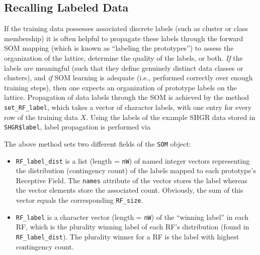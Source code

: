 \documentclass[]{article}
\newenvironment{Shaded}{\begin{snugshade}}{\end{snugshade}}
\newcommand{\KeywordTok}[1]{\textcolor[rgb]{0.13,0.29,0.53}{\textbf{#1}}}
\newcommand{\NormalTok}[1]{#1}
\newcommand{\OperatorTok}[1]{\textcolor[rgb]{0.81,0.36,0.00}{\textbf{#1}}}
\providecommand{\tightlist}{%
  \setlength{\itemsep}{0pt}\setlength{\parskip}{0pt}}
\begin{document}
\hypertarget{recalling-labeled-data}{%
\subsection{Recalling Labeled Data}\label{recalling-labeled-data}}

If the training data possesses associated discrete labels (such as cluster or class membership) it is often helpful to propagate these labels through the forward SOM mapping (which is known as ``labeling the prototypes'') to assess the organization of the lattice, determine the quality of the labels, or both. \emph{If} the labels are meaningful (such that they define genuinely distinct data classes or clusters), and \emph{if} SOM learning is adequate (i.e., performed correctly over enough training steps), then one expects an organization of prototype labels on the lattice. Propagation of data labels through the SOM is achieved by the method \texttt{set\_RF\_label}, which takes a vector of character labels, with one entry for every row of the training data \(X\). Using the labels of the example SHGR data stored in \texttt{SHGR\$label}, label propagation is performed via

\begin{Shaded}
\end{Shaded}

The above method sets two different fields of the \texttt{SOM} object:

\begin{itemize}
\tightlist
\item
  \texttt{RF\_label\_dist} is a list (length = \texttt{nW}) of named integer vectors representing the distribution (contingency count) of the labels mapped to each prototype's Receptive Field. The \texttt{names} attribute of the vector stores the label whereas the vector elements store the associated count. Obviously, the sum of this vector equals the corresponding \texttt{RF\_size}.
\item
  \texttt{RF\_label} is a character vector (length = \texttt{nW}) of the ``winning label'' in each RF, which is the plurality winning label of each RF's distribution (found in \texttt{RF\_label\_dist}). The plurality winner for a RF is the label with highest contingency count.
\end{itemize}
\end{document}
